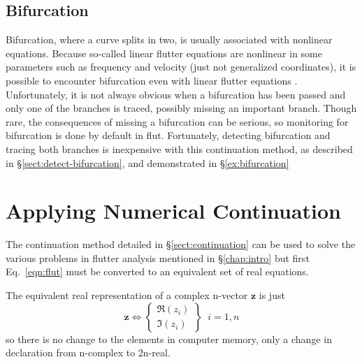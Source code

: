 \documentclass[11pt,openany,twoside]{book}
\numberwithin{equation}{section}		%
\newcommand{\Cmd}[1]{{\sf #1}}
\newcommand{\Matrix}[1]{\boldsymbol{#1}}
\newcommand{\Vector}[1]{\boldsymbol{#1}}
\newcommand{\Sectref}[1]{\S\ref{#1}}
\newcommand{\Eqn}[1]{Eq.\ \ref{#1}}  %
\begin{document}
\subsection{Bifurcation}\label{sect:bifurcation}
Bifurcation, where a curve splits in two, is usually associated
with nonlinear equations. Because so-called linear flutter equations
are nonlinear in some parameters such as frequency and velocity
(just not generalized coordinates),
it is possible to encounter bifurcation even with linear flutter
equations \cite{meyer2015continuation}.
Unfortunately, it is not always obvious when a bifurcation
has been passed and only one of the branches is traced, possibly
missing an important branch.
Though rare, the consequences of missing a bifurcation can be
serious, so monitoring for bifurcation is done by default in \Cmd{flut}.
Fortunately, detecting bifurcation
and tracing both branches is inexpensive with this continuation method,
as described in \Sectref{sect:detect-bifurcation}, and demonstrated
in \Sectref{ex:bifurcation}

\section{Applying Numerical Continuation}\label{sect:application}
The continuation method detailed in \Sectref{sect:continuation} can be
used to solve the various problems in flutter analysis mentioned in
\Sectref{chap:intro} but first \Eqn{eqn:flut} must be converted
to an equivalent set of real equations.

The equivalent real representation of a complex n-vector $\Vector{z}$
is just
\begin{equation}
\Vector{z} \Leftrightarrow \left\{ \begin{array}{c}
			\Re(z_{i}) \\
	   \Im(z_{i})
		\end{array} \right\} \;\; i=1,n
\end{equation}
so there is no change to the elements in computer memory, only
a change in declaration from n-complex to 2n-real.
\end{document}
